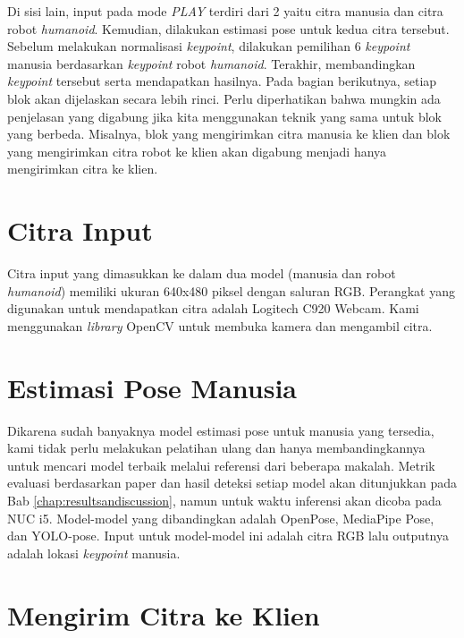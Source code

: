 Di sisi lain, input pada mode \textit{PLAY} terdiri dari 2 yaitu citra manusia dan citra robot \textit{humanoid}.
Kemudian, dilakukan estimasi pose untuk kedua citra tersebut. Sebelum melakukan normalisasi \textit{keypoint}, dilakukan pemilihan 6 \textit{keypoint} manusia berdasarkan \textit{keypoint} robot \textit{humanoid}.
Terakhir, membandingkan \textit{keypoint} tersebut serta mendapatkan hasilnya.
Pada bagian berikutnya, setiap blok akan dijelaskan secara lebih rinci. Perlu diperhatikan bahwa mungkin ada penjelasan yang digabung jika kita menggunakan teknik yang sama untuk blok yang berbeda.
Misalnya, blok yang mengirimkan citra manusia ke klien dan blok yang mengirimkan citra robot ke klien akan digabung menjadi hanya mengirimkan citra ke klien.


\section{Citra Input}
\label{sec:input-image}

Citra input yang dimasukkan ke dalam dua model (manusia dan robot \textit{humanoid}) memiliki ukuran 640x480 piksel dengan saluran RGB.
Perangkat yang digunakan untuk mendapatkan citra adalah Logitech C920 Webcam. Kami menggunakan \textit{library} OpenCV untuk membuka kamera dan mengambil citra.


\section{Estimasi Pose Manusia}
\label{sec:estimasi-pose-manusia}

Dikarena sudah banyaknya model estimasi pose untuk manusia yang tersedia, kami tidak perlu melakukan pelatihan ulang dan hanya membandingkannya untuk mencari model terbaik melalui referensi dari beberapa makalah.
Metrik evaluasi berdasarkan paper dan hasil deteksi setiap model akan ditunjukkan pada Bab \ref{chap:resultsandiscussion}, namun untuk waktu inferensi akan dicoba pada NUC i5.
Model-model yang dibandingkan adalah OpenPose, MediaPipe Pose, dan YOLO-pose. Input untuk model-model ini adalah citra RGB lalu outputnya adalah lokasi \textit{keypoint} manusia.

\section{Mengirim Citra ke Klien}
\label{sec:send-image-to-client}


